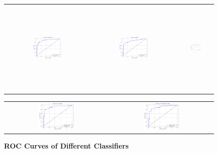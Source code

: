\documentclass[pt]{article}  %
\begin{document}
\begin{figure}[H]
\begin{center}
\vspace{5pt} %

\begin{tabular}{c c c} %
    \includegraphics[width=0.35\textwidth]{roc-curve/rf.png} &
    \includegraphics[width=0.35\textwidth]{roc-curve/ada.png} &
    \includegraphics[width=0.34\textwidth,height = 4.5cm]{roc-curve/gb.png} \\
\end{tabular}

\vspace{5pt} %

\begin{tabular}{c c} %
    \includegraphics[width=0.35\textwidth]{roc-curve/cb.png} &
    \includegraphics[width=0.35\textwidth]{roc-curve/ann.png} \\
\end{tabular}
\end{center}
    \caption{\textbf{ROC Curves of Different Classifiers}}
    \label{fig:roc-figure} 
\end{figure}
\end{document}

